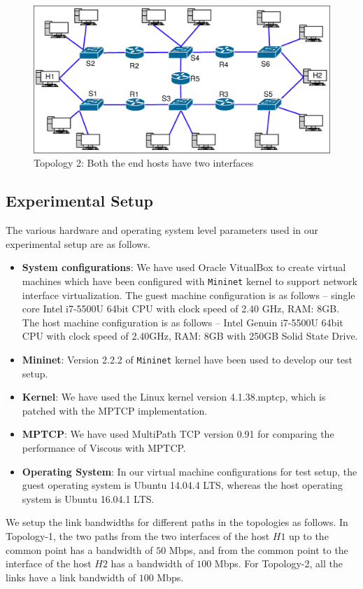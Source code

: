 \begin{figure}[!ht]
	\centering
	\includegraphics[width=0.7\linewidth]{img/experimentalTopology2}
	\caption{Topology 2: Both the end hosts have two interfaces}
	\label{fig:experimentalTopology2}
\end{figure}



\subsection{Experimental Setup}
The various hardware and operating system level parameters used in our experimental setup are as follows. 
\begin{itemize}
    \item \textbf{System configurations}: We have used Oracle VitualBox to create virtual machines which have been configured with \texttt{Mininet} kernel to support network interface virtualization. The guest machine configuration is as follows -- single core Intel i7-5500U 64bit CPU with clock speed of 2.40 GHz, RAM: 8GB. The host machine configuration is as follows -- Intel Genuin i7-5500U 64bit CPU with clock speed of 2.40GHz, RAM: 8GB with 250GB Solid State Drive.
    \item \textbf{Mininet}: Version 2.2.2 of \texttt{Mininet} kernel have been used to develop our test setup.
    \item \textbf{Kernel}: We have used the Linux kernel version 4.1.38.mptcp, which is patched with the MPTCP implementation.
    \item \textbf{MPTCP}: We have used MultiPath TCP version 0.91 for comparing the performance of Viscous with MPTCP.
    \item \textbf{Operating System}: In our virtual machine configurations for test setup, the guest operating system is Ubuntu 14.04.4 LTS, whereas the host operating system is Ubuntu 16.04.1 LTS. 
\end{itemize}
We setup the link bandwidths for different paths in the topologies as follows. In Topology-1, the two paths from the two interfaces of the host $H1$ up to the common point has a bandwidth of $50$ Mbps, and from the common point to the interface of the host $H2$ has a bandwidth of $100$ Mbps. For Topology-2, all the links have a link bandwidth of $100$ Mbps. 
 
